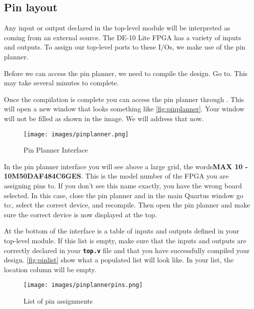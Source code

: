 \documentclass[12pt]{betterjournal}
\begin{document}
\subsection{Pin layout}
Any input or output declared in the top-level module will be interpreted as coming from an external source. The DE-10 Lite FPGA has a variety of inputs and outputs. To assign our top-level ports to these I/Os, we make use of the pin planner.

Before we can access the pin planner, we need to compile the design. Go to. This may take several minutes to complete.

Once the compilation is complete you can access the pin planner through . This will open a new window that looks something like \autoref{fig:pinplanner}. Your window will not be filled as shown in the image. We will address that now. \hfill\break
\begin{figure}
    \centering
    \texttt{[image: images/pinplanner.png]}
    \caption{Pin Planner Interface}
    \label{fig:pinplanner}
\end{figure}
\begin{extra}[frametitle={Board Selection}]
    In the pin planner interface you will see above a large grid, the words\hfill\break \textbf{MAX 10 - 10M50DAF484C6GES}. This is the model number of the FPGA you are assigning pins to. If you don't see this name exactly, you have the wrong board selected. In this case, close the pin planner and in the main Quartus window go to:\hfill\break {}, select the correct device, and recompile. Then open the pin planner and make sure the correct device is now displayed at the top.
\end{extra}

At the bottom of the interface is a table of inputs and outputs defined in your top-level module. If this list is empty, make sure that the inputs and outputs are correctly declared in your \textbf\texttt{top.v} file and that you have successfully compiled your design. \autoref{fig:pinlist} show what a populated list will look like. In your list, the location column will be empty.

\begin{figure}
    \centering
    \texttt{[image: images/pinplannerpins.png]}
    \caption{List of pin assignments}
    \label{fig:pinlist}
\end{figure}
\end{document}

